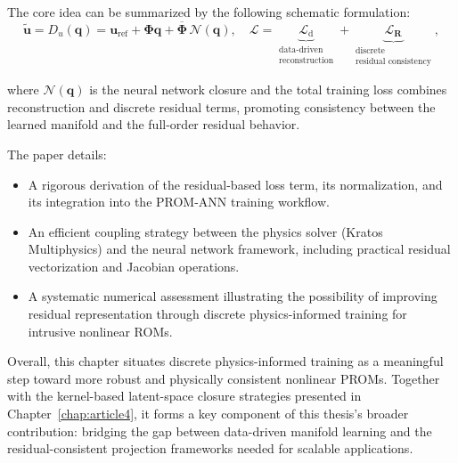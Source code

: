 \vspace{0.5em}
\noindent
The core idea can be summarized by the following schematic formulation:
\begin{equation}
\tilde{\mathbf{u}} = D_u(\mathbf{q}) = \mathbf{u}_{\text{ref}} + \boldsymbol{\Phi} \mathbf{q} + \overline{\boldsymbol{\Phi}}\, \mathcal{N}(\mathbf{q}),
\quad
\mathcal{L} = 
\underbrace{\mathcal{L}_\text{d}}_{\substack{\text{data-driven} \\ \text{reconstruction}}}
+ 
\underbrace{\mathcal{L}_\mathbf{R}}_{\substack{\text{discrete} \\ \text{residual consistency}}},
\label{eq:high_level_loss_preface}
\end{equation}

where \(\mathcal{N}(\mathbf{q})\) is the neural network closure and the total training loss combines reconstruction and discrete residual terms, promoting consistency between the learned manifold and the full-order residual behavior.


The paper details:
\begin{itemize}
    \item A rigorous derivation of the residual-based loss term, its normalization, and its integration into the PROM-ANN training workflow.
    \item An efficient coupling strategy between the physics solver (Kratos Multiphysics) and the neural network framework, including practical residual vectorization and Jacobian operations.
    \item A systematic numerical assessment illustrating the possibility of improving residual representation through discrete physics-informed training for intrusive nonlinear ROMs.
\end{itemize}

Overall, this chapter situates discrete physics-informed training as a meaningful step toward more robust and physically consistent nonlinear PROMs. Together with the kernel-based latent-space closure strategies presented in Chapter~\ref{chap:article4}, it forms a key component of this thesis’s broader contribution: bridging the gap between data-driven manifold learning and the residual-consistent projection frameworks needed for scalable applications.



